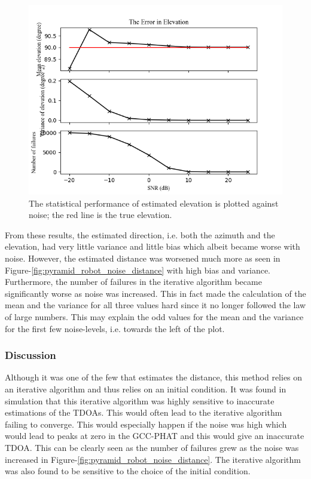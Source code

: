 \documentclass{report}
\begin{document}
\begin{figure}[H]
\includegraphics[width=1\textwidth]{../Python/pyramid_robot/noise_elevation.png}
\centering
\caption{The statistical performance of estimated elevation is plotted against noise; the red line is the true elevation.}
\label{fig:pyramid_robot_noise_elevation}
\centering
\end{figure}

From these results, the estimated direction, i.e. both the azimuth and the elevation, had very little variance and little bias which albeit became worse with noise. However, the estimated distance was worsened much more as seen in Figure-\ref{fig:pyramid_robot_noise_distance} with high bias and variance. Furthermore, the number of failures in the iterative algorithm became significantly worse as noise was increased. This in fact made the calculation of the mean and the variance for all three values hard since it no longer followed the law of large numbers. This may explain the odd values for the mean and the variance for the first few noise-levels, i.e. towards the left of the plot.

\subsubsection{Discussion}

Although it was one of the few that estimates the distance, this method relies on an iterative algorithm and thus relies on an initial condition. It was found in simulation that this iterative algorithm was highly sensitive to inaccurate estimations of the TDOAs. This would often lead to the iterative algorithm failing to converge. This would especially happen if the noise was high which would lead to peaks at zero in the GCC-PHAT and this would give an inaccurate TDOA. This can be clearly seen as the number of failures grew as the noise was increased in Figure-\ref{fig:pyramid_robot_noise_distance}. The iterative algorithm was also found to be sensitive to the choice of the initial condition.
\end{document}
